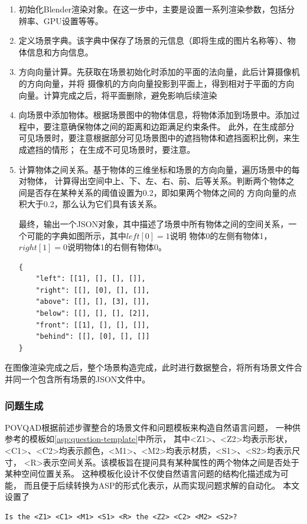 \begin{enumerate}[nosep]
\item 初始化Blender渲染对象。在这一步中，主要是设置一系列渲染参数，包括分辨率、GPU设置等等。
\item 定义场景字典。该字典中保存了场景的元信息（即将生成的图片名称等）、物体信息和方向信息。
\item 方向向量计算。先获取在场景初始化时添加的平面的法向量，此后计算摄像机的方向向量，并将
摄像机的方向向量投影到平面上，得到相对于平面的方向向量。计算完成之后，将平面删除，避免影响后续渲染
\item 向场景中添加物体。根据场景图中的物体信息，将物体添加到场景中。添加过程中，要注意确保物体之间的距离和边距满足约束条件。
此外，在生成部分可见场景时，要注意根据部分可见场景图中的遮挡物体和遮挡面积比例，来生成遮挡的情形；
在生成不可见场景时，要注意。
\item 计算物体之间关系。基于物体的三维坐标和场景的方向向量，遍历场景中的每对物体，
计算得出空间中上、下、左、右、前、后等关系。判断两个物体之间是否存在某种关系的阈值设置为0.2，即如果两个物体之间的
方向向量的点积大于0.2，那么认为它们具有该关系。

最终，输出一个JSON对象，其中描述了场景中所有物体之间的空间关系，一个可能的字典如图所示，其中$left[0] = 1$说明
物体0的左侧有物体1，$right[1] = 0$说明物体1的右侧有物体0。
\begin{lstlisting}
{
    "left": [[1], [], [], []],
    "right": [[], [0], [], []],
    "above": [[], [], [3], []],
    "below": [[], [], [], [2]],
    "front": [[1], [], [], []],
    "behind": [[], [0], [], []]
}
\end{lstlisting}
\end{enumerate}

在图像渲染完成之后，整个场景构造完成，此时进行数据整合，将所有场景文件合并同一个包含所有场景的JSON文件中。

\subsubsection{问题生成}
POVQAD根据前述步骤整合的场景文件和问题模板来构造自然语言问题，
一种供参考的模板如\ref{asp:question-template}中所示，
其中<Z1>、<Z2>均表示形状，<C1>、<C2>均表示颜色，<M1>、<M2>均表示材质，<S1>、<S2>均表示尺寸，
<R>表示空间关系。该模板旨在提问具有某种属性的两个物体之间是否处于某种空间位置关系。
这种模板化设计不仅使自然语言问题的结构化描述成为可能，
而且便于后续转换为ASP的形式化表示，从而实现问题求解的自动化。
本文设置了
\begin{lstlisting}[label=asp:question-template]
Is the <Z1> <C1> <M1> <S1> <R> the <Z2> <C2> <M2> <S2>?  
\end{lstlisting}

